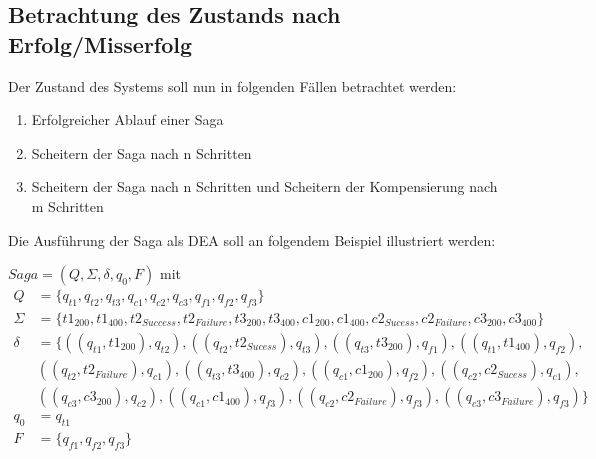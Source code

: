 \subsection{Betrachtung des Zustands nach Erfolg/Misserfolg}\label{subsubsection_dea_simple}
Der Zustand des Systems soll nun in folgenden Fällen betrachtet werden:
\begin{enumerate}%
	\item Erfolgreicher Ablauf einer Saga
	\item Scheitern der Saga nach n Schritten
	\item Scheitern der Saga nach n Schritten und Scheitern der Kompensierung nach m Schritten
\end{enumerate}

Die Ausführung der Saga als DEA soll an folgendem Beispiel illustriert werden:

$Saga = (Q, \Sigma, \delta, q_0, F)$ mit
\begin{align*}
	Q &= \{q_{t1}, q_{t2}, q_{t3}, q_{c1}, q_{c2}, q_{c3}, q_{f1}, q_{f2}, q_{f3}\}\\
	\Sigma &= \{t1_{200}, t1_{400}, t2_{Success}, t2_{Failure}, t3_{200}, t3_{400}, c1_{200}, c1_{400}, c2_{Sucess}, c2_{Failure}, c3_{200}, c3_{400}\}\\
	\delta &= \{((q_{t1}, t1_{200}), q_{t2}), 
	((q_{t2}, t2_{Sucess}), q_{t3}), 
	((q_{t3}, t3_{200}), q_{f1}), 
	((q_{t1}, t1_{400}), q_{f2}), \\
	&((q_{t2}, t2_{Failure}), q_{c1}), 
	((q_{t3}, t3_{400}), q_{c2}), 
	((q_{c1}, c1_{200}), q_{f2}), 
	((q_{c2}, c2_{Sucess}), q_{c1}),\\ 
	&((q_{c3}, c3_{200}), q_{c2}), 
	((q_{c1}, c1_{400}), q_{f3}), 
	((q_{c2}, c2_{Failure}), q_{f3}), 
	((q_{c3}, c3_{Failure}), q_{f3})\} \\
	q_0 &= q_{t1}\\
	F &= \{q_{f1}, q_{f2}, q_{f3}\}
\end{align*}



